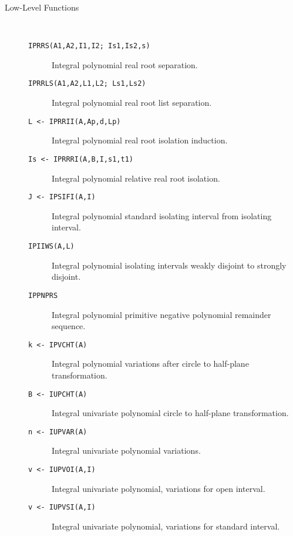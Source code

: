 \begin{description}
\item[Low-Level Functions] \ \
  \begin{description}
  \item[{\tt  IPRRS(A1,A2,I1,I2; Is1,Is2,s) 
}]  Integral polynomial real root separation.
  \item[{\tt  IPRRLS(A1,A2,L1,L2; Ls1,Ls2) 
}]  Integral polynomial real root list separation.
  \item[{\tt L <- IPRRII(A,Ap,d,Lp) 
}]  Integral polynomial real root isolation induction.
  \item[{\tt Is <- IPRRRI(A,B,I,s1,t1) 
}]  Integral polynomial relative real root isolation.
  \item[{\tt J <- IPSIFI(A,I) 
}]  Integral polynomial standard isolating interval from isolating interval.
  \item[{\tt  IPIIWS(A,L) 
}]  Integral polynomial isolating intervals weakly disjoint to strongly disjoint.
  \item[{\tt IPPNPRS}]\index{IPPNPRS} Integral polynomial primitive negative polynomial remainder sequence.
  \item[{\tt k <- IPVCHT(A) 
}]  Integral polynomial variations after circle to half-plane transformation.
  \item[{\tt B <- IUPCHT(A) 
}]  Integral univariate polynomial circle to half-plane transformation.
  \item[{\tt n <- IUPVAR(A) 
}]  Integral univariate polynomial variations.
  \item[{\tt v <- IUPVOI(A,I) 
}]  Integral univariate polynomial, variations for open interval.
  \item[{\tt v <- IUPVSI(A,I) 
}]  Integral univariate polynomial, variations for standard interval.
  \end{description}

\end{description}
